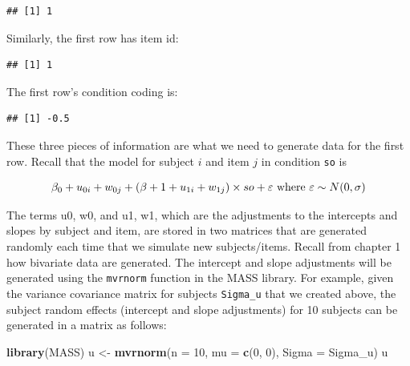 \documentclass[12pt,]{krantz}
\newenvironment{Shaded}{\begin{snugshade}}{\end{snugshade}}
\newcommand{\DataTypeTok}[1]{\textcolor[rgb]{0.13,0.29,0.53}{#1}}
\newcommand{\DecValTok}[1]{\textcolor[rgb]{0.00,0.00,0.81}{#1}}
\newcommand{\KeywordTok}[1]{\textcolor[rgb]{0.13,0.29,0.53}{\textbf{#1}}}
\newcommand{\NormalTok}[1]{#1}
\newcommand{\OperatorTok}[1]{\textcolor[rgb]{0.81,0.36,0.00}{\textbf{#1}}}
\newcommand{\StringTok}[1]{\textcolor[rgb]{0.31,0.60,0.02}{#1}}
\begin{document}
\begin{verbatim}
## [1] 1
\end{verbatim}

Similarly, the first row has item id:

\begin{Shaded}
\end{Shaded}

\begin{verbatim}
## [1] 1
\end{verbatim}

The first row's condition coding is:

\begin{Shaded}
\end{Shaded}

\begin{verbatim}
## [1] -0.5
\end{verbatim}

These three pieces of information are what we need to generate data for the first row. Recall that the model for subject \(i\) and item \(j\) in condition \texttt{so} is

\begin{equation}
\beta_0 + u_{0i} + w_{0j} + (\beta+1 + u_{1i} + w_{1j})\times so + \varepsilon \hbox{ where } \varepsilon \sim N(0,\sigma)
\end{equation}

The terms u0, w0, and u1, w1, which are the adjustments to the intercepts and slopes by subject and item, are stored in two matrices that are generated randomly each time that we simulate new subjects/items. Recall from chapter 1 how bivariate data are generated. The intercept and slope adjustments will be generated using the \texttt{mvrnorm} function in the MASS library. For example, given the variance covariance matrix for subjects \texttt{Sigma\_u} that we created above, the subject random effects (intercept and slope adjustments) for 10 subjects can be generated in a matrix as follows:

\begin{Shaded}
\begin{Highlighting}[]
\KeywordTok{library}\NormalTok{(MASS)}
\NormalTok{u <-}\StringTok{ }\KeywordTok{mvrnorm}\NormalTok{(}\DataTypeTok{n =} \DecValTok{10}\NormalTok{, }\DataTypeTok{mu =} \KeywordTok{c}\NormalTok{(}\DecValTok{0}\NormalTok{, }\DecValTok{0}\NormalTok{), }\DataTypeTok{Sigma =}\NormalTok{ Sigma_u)}
\NormalTok{u}
\end{Highlighting}
\end{Shaded}
\end{document}
